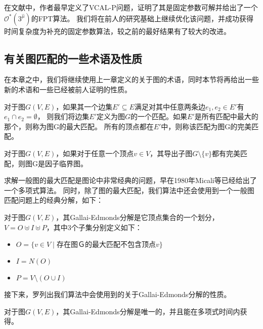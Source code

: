 在文献\cite{garg2015raising}中，作者最早定义了VCAL-P问题，证明了其是固定参数可解并给出了一个$\mathcal{O}^*(3^{\hat\mu})$的FPT算法。
我们将在前人的研究基础上继续优化该问题，并成功获得时间复杂度为\textcolor[rgb]{1.00,0.00,0.00}{补充}的固定参数算法，较之前的最好结果有了较大的改进。

\subsection{有关图匹配的一些术语及性质}
在本章之中，我们将继续使用上一章定义的关于图的术语，同时本节将再给出一些新的术语和一些已经被前人证明的性质。

\begin{definition}[匹配集]
对于图$G(V, E)$，如果其一个边集$E' \subseteq E$满足对其中任意两条边$e_1, e_2 \in E'$有$e_1 \cap e_2 = \emptyset$，
则我们将边集$E'$定义为图$G$的一个匹配。如果$E'$是所有匹配中最大的那个，则称为图G的最大匹配。
所有的顶点都在$E'$中，则称该匹配为图G的完美匹配。
\end{definition}

\begin{definition}
对于图$G(V, E)$，如果对于任意一个顶点$v \in V$，其导出子图$G \setminus \{v\}$都有完美匹配，则图G是因子临界图。
\end{definition}

求解一般图的最大匹配是图论中非常经典的问题，早在1980年Micali等已经给出了一个多项式算法。 
同时，除了图的最大匹配，我们算法中还会使用到一个一般图匹配问题上的经典分解，如下：

\begin{definition}
对于图$G(V, E)$，其Gallai-Edmonds分解是它顶点集合的一个划分，$V = O \uplus I \uplus P$，其中3个子集分别定义如下：
\begin{itemize}
  \item $O = \{v \in V\;|\;\text{存在图Ｇ的最大匹配不包含顶点$v$} \}$
  \item $I = N(O)$
  \item $P = V \setminus (O \cup I)$
\end{itemize}
\end{definition}

接下来，罗列出我们算法中会使用到的关于Gallai-Edmonds分解的性质。

\begin{lemma}
对于图$G(V, E)$，其Gallai-Edmonds分解是唯一的，并且能在多项式时间内获得。
\end{lemma}

